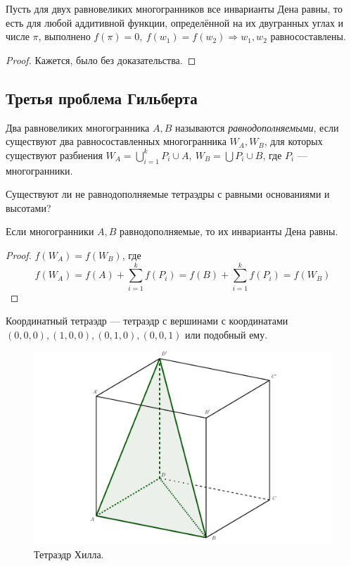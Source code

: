 \begin{theorem}[Сидлер]
    Пусть для двух равновеликих многогранников все инварианты Дена равны, то есть для любой аддитивной функции, определённой на их двугранных углах и числе $\pi$, выполнено $f(\pi) = 0, \ f(w_1) = f(w_2) \Rightarrow w_1, w_2$ равносоставлены.
\end{theorem}
\begin{proof}
    Кажется, было без доказательства.
\end{proof} 

\subsection{Третья проблема Гильберта}
\begin{definition}
    Два равновеликих многогранника $A, B$ называются \textit{равнодополняемыми}, если существуют два равносоставленных многогранника $W_A, W_B$, для которых существуют разбиения $W_A = \bigcup_{i = 1}^k P_i \cup A, \ W_B = \bigcup P_i \cup B$, где $P_i$ — многогранники.
\end{definition}

\begin{theorem}
    Существуют ли не равнодополняемые тетраэдры с равными основаниями и высотами?
\end{theorem}

\begin{statement}
    Если многогранники $A,B$ равнодополняемые, то их инварианты Дена равны.
\end{statement}
\begin{proof}
    $f(W_A) = f(W_B)$, где $$f(W_A) = f(A) + \sum_{i = 1}^{k} f(P_i) = f(B) + \sum_{i = 1}^{k} f(P_i) = f(W_B)$$
\end{proof}

\begin{definition}
    Координатный тетраэдр — тетраэдр с вершинами с координатами $(0,0,0), (1,0,0), (0,1,0), (0,0,1)$ или подобный ему.
\end{definition} 

\begin{figure}[htbp]
    \centering
    \includegraphics[scale=0.2]{images/c9.7.png}
    \caption{Тетраэдр Хилла.}
    \label{fig:c9.7}
\end{figure}

